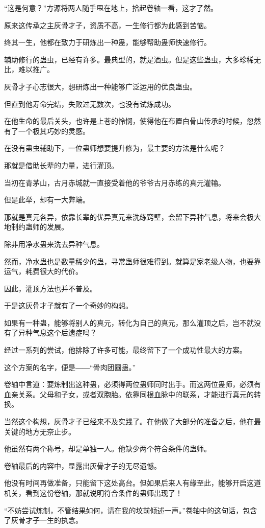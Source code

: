 \begin{this_body}
“这是何意？”方源将两人随手甩在地上，拾起卷轴一看，这才了然。

原来这传承之主灰骨才子，资质不高，一生修行都为此感到苦恼。

终其一生，他都在致力于研炼出一种蛊，能够帮助蛊师快速修行。

辅助修行的蛊虫，已经有许多。最典型的，就是酒虫。但是这些蛊虫，大多珍稀无比，难以推广。

灰骨才子心志很大，想研炼出一种能够广泛运用的优良蛊虫。

但直到他寿命完结，失败过无数次，也没有试炼成功。

在他生命的最后关头，也许是上苍的怜悯，使得他在布置白骨山传承的时候，忽然有了一个极其巧妙的灵感。

在没有蛊虫辅助下，一位蛊师想要提升修为，最主要的方法是什么呢？

那就是借助长辈的力量，进行灌顶。

当初在青茅山，古月赤城就一直接受着他的爷爷古月赤练的真元灌输。

但是此举，却有一大弊端。

那就是真元各异，依靠长辈的优异真元来洗练窍壁，会留下异种气息，将来会极大地制约蛊师的发展。

除非用净水蛊来洗去异种气息。

然而，净水蛊也是数量稀少的蛊，寻常蛊师很难得到。就算是家老级人物，也要靠运气，耗费很大的代价。

因此，灌顶方法也并不普及。

于是这灰骨才子就有了一个奇妙的构想。

如果有一种蛊，能够将别人的真元，转化为自己的真元，那么灌顶之后，岂不就没有了异种气息这个后遗症吗？

经过一系列的尝试，他排除了许多可能，最终留下了一个成功性最大的方案。

这个方案的名字，便是――“骨肉团圆蛊。”

卷轴中言道：要炼制出这种蛊，必须得两位蛊师同时出手。而这两位蛊师，必须有血亲关系。父母和子女，或者双胞胎。依靠同根血脉中的联系，才能进行真元的转换。

当然这个构想，灰骨才子已经来不及实践了。在他做了大部分的准备之后，他在最关键的地方无奈止步。

他虽然有两个称号，却是单独一人。他缺少两个符合条件的蛊师。

卷轴最后的内容中，显露出灰骨才子的无尽遗憾。

他没有时间再做准备，只能留下这处高台。但如果后来人有缘至此，能够开启这道机关，看到这份卷轴，那就说明符合条件的蛊师出现了！

“不妨尝试炼制，不管结果如何，请在我的坟前倾述一声。”卷轴中的这句话，包含了灰骨才子一生的执念。


\end{this_body}
